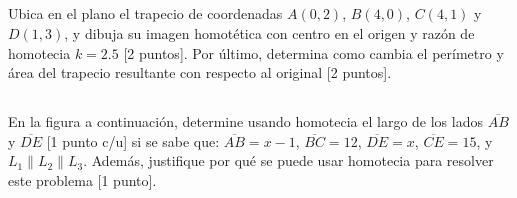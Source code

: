 \documentclass{cdplf-prueba}
\begin{document}
\begin{desarrollo}[height=9cm]
\end{desarrollo}
\begin{respuesta}[height=2cm]
\end{respuesta}

\subsection{} 
Ubica en el plano el trapecio de coordenadas $A(0,2)$, $B(4,0)$, $C(4,1)$ y
$D(1,3)$, y dibuja su imagen homotética con centro en el origen y razón
de homotecia $k=2.5$ [2 puntos]. Por último, determina como cambia el perímetro 
y área del trapecio resultante con respecto al original [2 puntos]. 

\begin{center}
    \plano[15][10][0][0][0.8cm]    
\end{center}
\begin{desarrollo}[height=8cm]
\end{desarrollo}
\begin{respuesta}[height=2cm]
\end{respuesta}

\subsection{} En la figura a continuación, determine usando homotecia el largo de los lados 
$\overline{AB}$ y $\overline{DE}$ [1 punto c/u] si se sabe que: 
$\overline{AB} = x - 1$, $\overline{BC} = 12$, $\overline{DE} = x$, $\overline{CE} = 15$, y 
$L_1 \parallel L_2 \parallel L_3$. Además, justifique por qué se puede usar homotecia para 
resolver este problema [1 punto].
\end{document}
